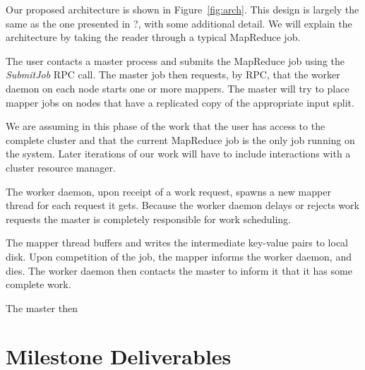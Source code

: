\documentclass[10pt,letter,final,article,twocolumn]{article} %
\newcommand{\rpc}[1]{\emph{#1}}
\begin{document}
Our proposed architecture is shown in Figure~\ref{fig:arch}. This design is largely the same as the one presented in 
?, with some additional detail. We will explain the architecture by taking the reader through a typical MapReduce job.

The user contacts a master process and submits the MapReduce job using the \rpc{SubmitJob} RPC call. The master job then requests, by RPC, that the worker daemon on each node starts one or more mappers. The master will try to place mapper jobs on nodes that have a replicated copy of the appropriate input split.

We are assuming in this phase of the work that the user has access to the complete cluster and that the current MapReduce job is the only job running on the system. Later iterations of our work will have to include interactions with a cluster resource manager.

 The worker daemon, upon receipt of a work request, spawns a new mapper thread for each request it gets. Because the worker daemon delays or rejects work requests the master is completely responsible for work scheduling.

The mapper thread buffers and writes the intermediate key-value pairs to local disk. Upon competition of the job, the mapper informs the worker daemon, and dies. The worker daemon then contacts the master to inform it that it has some complete work.

The master then 


\section{Milestone Deliverables}



\end{document}
